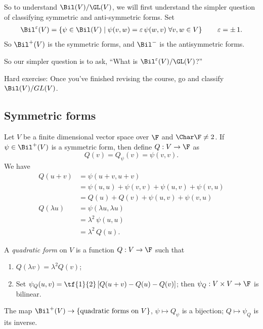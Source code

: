 So to understand $\Bil(V)/\GL(V)$, we will first understand the simpler question of classifying symmetric and anti-symmetric forms. Set
\begin{gather*}
	\textstyle\Bil^\varepsilon(V) = \left\{\psi\in\Bil(V) \mid \psi(v,w) = \varepsilon\,\psi(w,v)\;\forall v,w\in V\right\} \qquad \varepsilon=\pm\,1. %
\end{gather*}
So $\Bil^+(V)$ is the symmetric forms, and $\Bil^-$ is the antisymmetric forms.

So our simpler question is to ask, ``What is $\Bil^\varepsilon(V)/\GL(V)$?''

Hard exercise: Once you've finished revising the course, go and classify $\Bil(V)/GL(V)$.

\subsection{Symmetric forms} %
\label{sub:symmetric_forms}

Let $V$ be a finite dimensional vector space over $\F$ and $\Char\F\neq 2$. If $\psi\in\Bil^+(V)$ is a symmetric form, then define $Q:V\to\F$ as
\begin{equation*}
	Q(v) = Q_\psi(v) = \psi(v,v).
\end{equation*}
We have
\begin{align*}
	Q(u+v)
		&= \psi(u+v,u+v) \\
		&= \psi(u,u) + \psi(v,v) + \psi(u,v) + \psi(v,u) \\
		&= Q(u) + Q(v) + \psi(u,v) + \psi(v,u) \\
	Q(\lambda u)
		&= \psi(\lambda u, \lambda u) \\
		&= \lambda^2 \,\psi(u,u) \\
		&= \lambda^2 \, Q(u).
\end{align*}

\begin{definition}
	A \emph{quadratic form} on $V$ is a function $Q:V\to\F$ such that %
	\begin{enumerate}
		\shortskip
		\item $Q(\lambda v) = \lambda^2 Q(v)$;
		\item Set $\psi_Q(u,v) = \tf{1}{2}\left[ Q(u+v) - Q(u) - Q(v) \right]$; then $\psi_Q:V\times V \to \F$ is bilinear. %
	\end{enumerate}
\end{definition}

\begin{lemma} The map
	$\Bil^+(V) \to \left\{\text{quadratic forms on } V\right\}$,
$\psi \mapsto Q_\psi$ is a bijection; $Q\mapsto \psi_Q$ is its inverse. %
\end{lemma}

